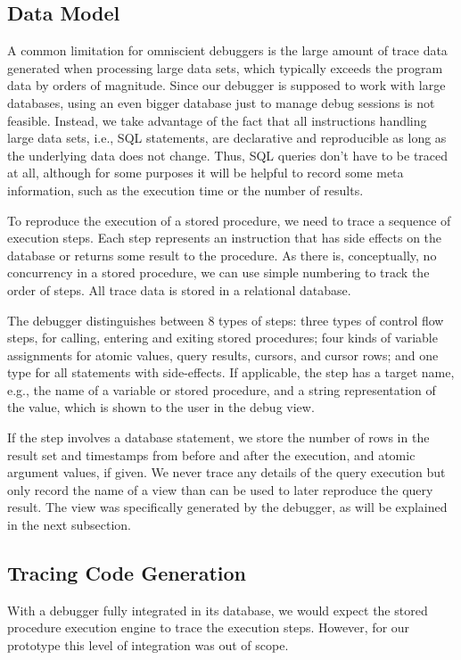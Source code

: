 \documentclass[english]{sig-alternate-05-2015}
\begin{document}
\subsection{Data Model}

A common limitation for omniscient debuggers is the large amount of trace data generated when processing large data sets, which typically exceeds the program data by orders of magnitude.
Since our debugger is supposed to work with large databases, using an even bigger database just to manage debug sessions is not feasible.
Instead, we take advantage of the fact that all instructions handling large data sets, i.e., SQL statements, are declarative and reproducible as long as the underlying data does not change.
Thus, SQL queries don't have to be traced at all, although for some purposes it will be helpful to record some meta information, such as the execution time or the number of results.

To reproduce the execution of a stored procedure, we need to trace a sequence of execution steps.
Each step represents an instruction that has side effects on the database or returns some result to the procedure.
As there is, conceptually, no concurrency in a stored procedure, we can use simple numbering to track the order of steps.
All trace data is stored in a relational database.

The debugger distinguishes between 8 types of steps:
three types of control flow steps, for calling, entering and exiting stored procedures;
four kinds of variable assignments for atomic values, query results, cursors, and cursor rows;
and one type for all statements with side-effects.
If applicable, the step has a target name, e.g., the name of a variable or stored procedure, and a string representation of the value, which is shown to the user in the debug view.

If the step involves a database statement, we store the number of rows in the result set and timestamps from before and after the execution, and atomic argument values, if given.
We never trace any details of the query execution but only record the name of a view than can be used to later reproduce the query result.
The view was specifically generated by the debugger, as will be explained in the next subsection.

\subsection{Tracing Code Generation}

With a debugger fully integrated in its database, we would expect the stored procedure execution engine to trace the execution steps.
However, for our prototype this level of integration was out of scope.
\end{document}

